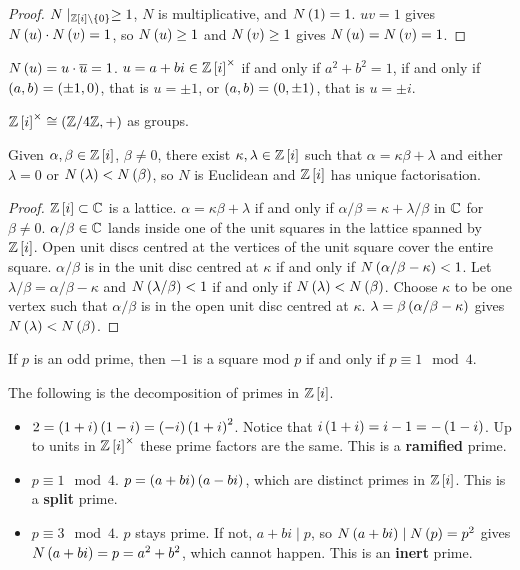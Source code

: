 \begin{proof}
$ N \mid_{\mathbb{Z}\left[ i \right] \setminus \left\{ 0 \right\}} \ge 1 $, $ N $ is multiplicative, and $ N\left( 1 \right) = 1 $. $ uv = 1 $ gives $ N\left( u \right) \cdot N\left( v \right) = 1 $, so $ N\left( u \right) \ge 1 $ and $ N\left( v \right) \ge 1 $ gives $ N\left( u \right) = N\left( v \right) = 1 $.
\end{proof}

$ N\left( u \right) = u \cdot \overline{u} = 1 $. $ u = a + bi \in \mathbb{Z}\left[ i \right]^\times $ if and only if $ a^2 + b^2 = 1 $, if and only if $ \left( a, b \right) = \left( \pm 1, 0 \right) $, that is $ u = \pm 1 $, or $ \left( a, b \right) = \left( 0, \pm 1 \right) $, that is $ u = \pm i $.

\begin{remark*}
$ \mathbb{Z}\left[ i \right]^\times \cong \left( \mathbb{Z} / 4\mathbb{Z}, + \right) $ as groups.
\end{remark*}

\begin{proposition}
Given $ \alpha, \beta \in \mathbb{Z}\left[ i \right] $, $ \beta \ne 0 $, there exist $ \kappa, \lambda \in \mathbb{Z}\left[ i \right] $ such that $ \alpha = \kappa\beta + \lambda $ and either $ \lambda = 0 $ or $ N\left( \lambda \right) < N\left( \beta \right) $, so $ N $ is Euclidean and $ \mathbb{Z}\left[ i \right] $ has unique factorisation.
\end{proposition}

\begin{proof}
$ \mathbb{Z}\left[ i \right] \subset \mathbb{C} $ is a lattice. $ \alpha = \kappa\beta + \lambda $ if and only if $ \alpha / \beta = \kappa + \lambda / \beta $ in $ \mathbb{C} $ for $ \beta \ne 0 $. $ \alpha / \beta \in \mathbb{C} $ lands inside one of the unit squares in the lattice spanned by $ \mathbb{Z}\left[ i \right] $. Open unit discs centred at the vertices of the unit square cover the entire square. $ \alpha / \beta $ is in the unit disc centred at $ \kappa $ if and only if $ N\left( \alpha / \beta - \kappa \right) < 1 $. Let $ \lambda / \beta = \alpha / \beta - \kappa $ and $ N\left( \lambda / \beta \right) < 1 $ if and only if $ N\left( \lambda \right) < N\left( \beta \right) $. Choose $ \kappa $ to be one vertex such that $ \alpha / \beta $ is in the open unit disc centred at $ \kappa $. $ \lambda = \beta\left( \alpha / \beta - \kappa \right) $ gives $ N\left( \lambda \right) < N\left( \beta \right) $.
\end{proof}

\begin{lemma}
If $ p $ is an odd prime, then $ -1 $ is a square mod $ p $ if and only if $ p \equiv 1 \mod 4 $.
\end{lemma}

The following is the decomposition of primes in $ \mathbb{Z}\left[ i \right] $.
\begin{itemize}
\item $ 2 = \left( 1 + i \right)\left( 1 - i \right) = \left( -i \right)\left( 1 + i \right)^2 $. Notice that $ i\left( 1 + i \right) = i - 1 = -\left( 1 - i \right) $. Up to units in $ \mathbb{Z}\left[ i \right]^\times $ these prime factors are the same. This is a \textbf{ramified} prime.
\item $ p \equiv 1 \mod 4 $. $ p = \left( a + bi \right)\left( a - bi \right) $, which are distinct primes in $ \mathbb{Z}\left[ i \right] $. This is a \textbf{split} prime.
\item $ p \equiv 3 \mod 4 $. $ p $ stays prime. If not, $ a + bi \mid p $, so $ N\left( a + bi \right) \mid N\left( p \right) = p^2 $ gives $ N\left( a + bi \right) = p = a^2 + b^2 $, which cannot happen. This is an \textbf{inert} prime.
\end{itemize}


